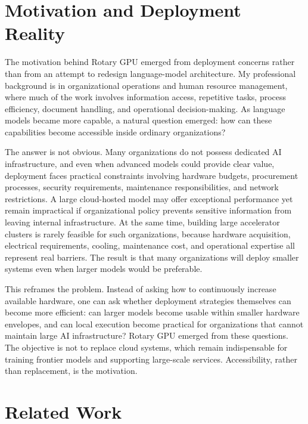 \documentclass[11pt]{article}
\begin{document}
\section{Motivation and Deployment Reality}

The motivation behind Rotary GPU emerged from deployment concerns rather than from an attempt to redesign language-model architecture. My professional background is in organizational operations and human resource management, where much of the work involves information access, repetitive tasks, process efficiency, document handling, and operational decision-making. As language models became more capable, a natural question emerged: how can these capabilities become accessible inside ordinary organizations?

The answer is not obvious. Many organizations do not possess dedicated AI infrastructure, and even when advanced models could provide clear value, deployment faces practical constraints involving hardware budgets, procurement processes, security requirements, maintenance responsibilities, and network restrictions. A large cloud-hosted model may offer exceptional performance yet remain impractical if organizational policy prevents sensitive information from leaving internal infrastructure. At the same time, building large accelerator clusters is rarely feasible for such organizations, because hardware acquisition, electrical requirements, cooling, maintenance cost, and operational expertise all represent real barriers. The result is that many organizations will deploy smaller systems even when larger models would be preferable.

This reframes the problem. Instead of asking how to continuously increase available hardware, one can ask whether deployment strategies themselves can become more efficient: can larger models become usable within smaller hardware envelopes, and can local execution become practical for organizations that cannot maintain large AI infrastructure? Rotary GPU emerged from these questions. The objective is not to replace cloud systems, which remain indispensable for training frontier models and supporting large-scale services. Accessibility, rather than replacement, is the motivation.

\section{Related Work}
\end{document}
